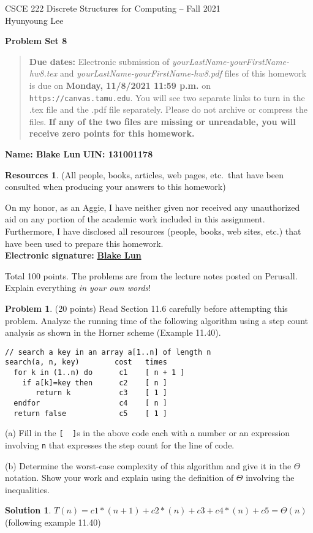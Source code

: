 \documentclass{article}
\theoremstyle{definition}
\newtheorem{problem}{Problem}
\newtheorem*{solution}{Solution}
\newtheorem*{resources}{Resources}
\newcommand{\name}[2]{\noindent\textbf{Name: #1}\hfill \textbf{UIN: #2}}
\newcommand{\honor}{\noindent On my honor, as an Aggie, I have neither
  given nor received any unauthorized aid on any portion of the
  academic work included in this assignment. Furthermore, I have
  disclosed all resources (people, books, web sites, etc.) that have
  been used to prepare this homework. \\[2ex]
 \textbf{Electronic signature:} \underline{ \textbf{Blake Lun} } }
\newcommand{\problemset}[1]{\begin{center}\textbf{Problem Set #1}\end{center}}
\newcommand{\duedate}[1]{\begin{quote}\textbf{Due dates:} Electronic
    submission of \textsl{yourLastName-yourFirstName-hw8.tex} and 
    \textsl{yourLastName-yourFirstName-hw8.pdf} files of this homework is due on
    \textbf{#1} on \texttt{https://canvas.tamu.edu}. You will see two separate links
    to turn in the .tex file and the .pdf file separately. Please do not archive or compress the files.  
    \textbf{If any of the two files are missing or unreadable, you will receive zero points for this
    homework.}\end{quote} }
\begin{document}
\vspace*{-20mm}
\begin{center}
{\large
CSCE 222 Discrete Structures for Computing -- Fall 2021\\[.5ex]
Hyunyoung Lee\\}
\end{center}
\problemset{8}
\duedate{Monday, 11/8/2021 11:59 p.m.}
\name{ Blake Lun }{ 131001178 }
\begin{resources} (All people, books, articles, web pages, etc.\ that
  have been consulted when producing your answers to this homework)
\end{resources}
\honor

\bigskip

\noindent
Total 100 points.
The problems are from the lecture notes posted on Perusall.
Explain everything \textit{in your own words}!

\medskip

\begin{problem} (20 points) Read Section 11.6 carefully before attempting this problem.
Analyze the running time of the following algorithm using a step count analysis 
as shown in the Horner scheme (Example 11.40).  
\begin{verbatim}
// search a key in an array a[1..n] of length n
search(a, n, key)        cost   times
  for k in (1..n) do      c1    [ n + 1 ]   
    if a[k]=key then      c2    [ n ]
       return k           c3    [ 1 ]
  endfor                  c4    [ n ]
  return false            c5    [ 1 ]
\end{verbatim}
(a) Fill in the \verb|[  ]|s in the above code each with a number or an expression involving
\verb|n| that expresses the step count for the line of code.

\medskip
\noindent
(b) Determine the worst-case complexity of this algorithm and give it in the $\Theta$ notation.
Show your work and explain using the definition of $\Theta$ involving the inequalities. 
\end{problem}
\begin{solution} 
$T(n) = c1 * (n + 1) + c2 * (n) + c3 + c4 * (n) + c5 = \Theta(n)$ (following example 11.40)
\end{solution}
\end{document}
